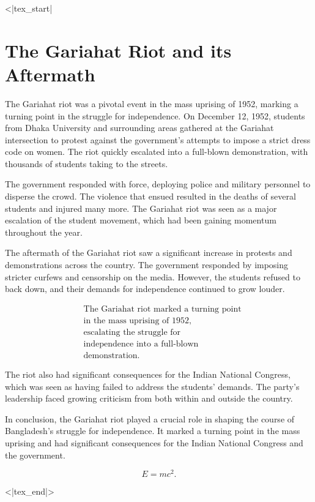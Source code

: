 <|tex_start|

\section{The Gariahat Riot and its Aftermath}

The Gariahat riot was a pivotal event in the mass uprising of 1952, marking a turning point in the struggle for independence. On December 12, 1952, students from Dhaka University and surrounding areas gathered at the Gariahat intersection to protest against the government's attempts to impose a strict dress code on women. The riot quickly escalated into a full-blown demonstration, with thousands of students taking to the streets.

The government responded with force, deploying police and military personnel to disperse the crowd. The violence that ensued resulted in the deaths of several students and injured many more. The Gariahat riot was seen as a major escalation of the student movement, which had been gaining momentum throughout the year.

The aftermath of the Gariahat riot saw a significant increase in protests and demonstrations across the country. The government responded by imposing stricter curfews and censorship on the media. However, the students refused to back down, and their demands for independence continued to grow louder.

\begin{align*}
& \text{The Gariahat riot marked a turning point}\\
& \text{in the mass uprising of 1952},\\
& \text{escalating the struggle for}\\
& \text{independence into a full-blown}\\
& \text{demonstration}.
\end{align*}

The riot also had significant consequences for the Indian National Congress, which was seen as having failed to address the students' demands. The party's leadership faced growing criticism from both within and outside the country.

In conclusion, the Gariahat riot played a crucial role in shaping the course of Bangladesh's struggle for independence. It marked a turning point in the mass uprising and had significant consequences for the Indian National Congress and the government.

\begin{equation}
E = mc^2.
\end{equation}

<|tex_end|>